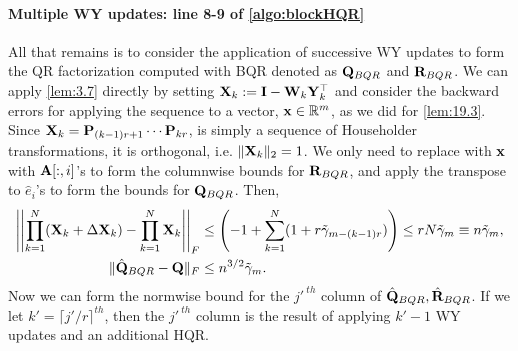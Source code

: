 \paragraph{Multiple WY updates: line 8-9 of \cref{algo:blockHQR}}
All that remains is to consider the application of successive WY updates to form the QR factorization computed with BQR denoted as $\mathbf{Q}_{BQR}$ and $\mathbf{R}_{BQR}$. 
We can apply \cref{lem:3.7} directly by setting $\mathbf{X}_{k}:= \mathbf{I}-\mathbf{W}_{k}\mathbf{Y}_{k}^{\top}$ and consider the backward errors for applying the sequence to a vector, $\mathbf{x}\in\mathbb{R}^{m}$, as we did for \cref{lem:19.3}. 
Since $\mathbf{X}_{k}=\mathbf{P}_{(k-1)r+1}\cdots\mathbf{P}_{kr}$, is simply a sequence of Householder transformations, it is orthogonal, i.e. $\|\mathbf{X}_{k}\|_2=1$.
We only need to replace with $\mathbf{x}$ with $\mathbf{A}[:,i]$'s to form the columnwise bounds for $\mathbf{R}_{BQR}$, and apply the transpose to $\hat{e}_i$'s to form the bounds for $\mathbf{Q}_{BQR}$. 
Then, 
\begin{align}
\left|\left|\prod_{k=1}^N (\bb{X}_{k} + \Delta \bb{X}_{k})- \prod_{k=1}^N\bb{X}_{k} \right|\right|_F &\leq\left(-1+\sum_{k=1}^N (1+r\tilde{\gamma}_{m-(k-1)r})\right) \leq rN\tilde{\gamma}_m \equiv n\tilde{\gamma}_m ,\label{eqn:BQR-mp}\\%
\|\hat{\bb{Q}}_{BQR}-\bb{Q}\|_F&\leq n^{3/2}\tilde{\gamma}_m. \label{eqn:BQR}
\end{align}
Now we can form the normwise bound for the $j'^{\ th}$ column of $\hat{\mathbf{Q}}_{BQR},\hat{\mathbf{R}}_{BQR}$. 
If we let $k' = \lceil j'/r\rceil^{th}$, then the $j'^{\ th}$ column is the result of applying $k'-1$ WY updates and an additional HQR. 
